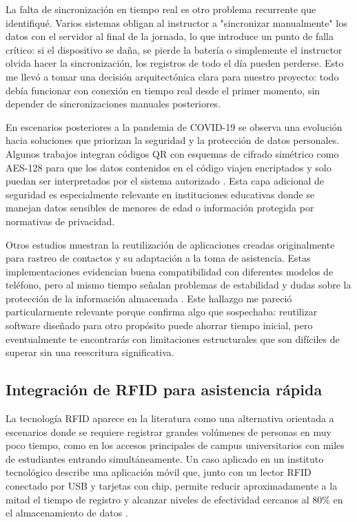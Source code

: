 La falta de sincronización en tiempo real es otro problema recurrente que identifiqué. Varios sistemas obligan al instructor a "sincronizar manualmente" los datos con el servidor al final de la jornada, lo que introduce un punto de falla crítico: si el dispositivo se daña, se pierde la batería o simplemente el instructor olvida hacer la sincronización, los registros de todo el día pueden perderse. Esto me llevó a tomar una decisión arquitectónica clara para nuestro proyecto: todo debía funcionar con conexión en tiempo real desde el primer momento, sin depender de sincronizaciones manuales posteriores.

En escenarios posteriores a la pandemia de COVID-19 se observa una evolución hacia soluciones que priorizan la seguridad y la protección de datos personales. Algunos trabajos integran códigos QR con esquemas de cifrado simétrico como AES-128 para que los datos contenidos en el código viajen encriptados y solo puedan ser interpretados por el sistema autorizado \cite{alamin2024qr_attendance_covid}. Esta capa adicional de seguridad es especialmente relevante en instituciones educativas donde se manejan datos sensibles de menores de edad o información protegida por normativas de privacidad.

Otros estudios muestran la reutilización de aplicaciones creadas originalmente para rastreo de contactos y su adaptación a la toma de asistencia. Estas implementaciones evidencian buena compatibilidad con diferentes modelos de teléfono, pero al mismo tiempo señalan problemas de estabilidad y dudas sobre la protección de la información almacenada \cite{perin2025qr_case_study_bisu}. Este hallazgo me pareció particularmente relevante porque confirma algo que sospechaba: reutilizar software diseñado para otro propósito puede ahorrar tiempo inicial, pero eventualmente te encontrarás con limitaciones estructurales que son difíciles de superar sin una reescritura significativa.

\subsection{Integración de RFID para asistencia rápida}

La tecnología RFID aparece en la literatura como una alternativa orientada a escenarios donde se requiere registrar grandes volúmenes de personas en muy poco tiempo, como en los accesos principales de campus universitarios con miles de estudiantes entrando simultáneamente. Un caso aplicado en un instituto tecnológico describe una aplicación móvil que, junto con un lector RFID conectado por USB y tarjetas con chip, permite reducir aproximadamente a la mitad el tiempo de registro y alcanzar niveles de efectividad cercanos al 80\% en el almacenamiento de datos \cite{mares2018rfid_event}.

